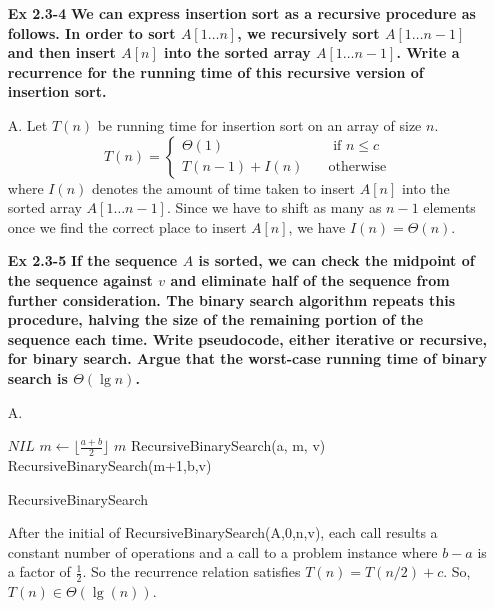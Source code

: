\documentclass[fontsize=12pt,paper=a4,open=any]{book}
\begin{document}
\begin{enumerate}
	\item[\textbf{Ex 2.3-4}]
		\textbf{We can express insertion sort as a recursive procedure as follows. In order to sort $A[1 \dots n]$, we recursively sort $A[1 \dots n-1]$ and then insert $A[n]$ into the sorted array $A[1 \dots n-1]$. Write a recurrence for the running time of this recursive version of insertion sort.}
			
	\item[A.]
		Let $T(n)$ be running time for insertion sort on an array of size $n$.\\
		\[ T(n) = \begin{cases} \Theta(1) & \quad \text{ if $n \leq c$}\\
		T(n-1) + I(n) & \quad \text{otherwise}
		\end{cases} \]
		where $I(n)$ denotes the amount of time taken to insert $A[n]$ into the sorted array $A[1 \dots n-1]$. Since we have to shift as many as $n-1$ elements once we find the correct place to insert $A[n]$, we have $I(n) = \Theta(n)$.
			
	\item[\textbf{Ex 2.3-5}]
		\textbf{If the sequence $A$ is sorted, we can check the midpoint of the sequence against $v$ and eliminate half of the sequence from further consideration. The binary search algorithm repeats this procedure, halving the size of the remaining portion of the sequence each time. Write pseudocode, either iterative or recursive, for binary search. Argue that the worst-case running time of binary search is $\Theta(\lg n)$.}
				
	\item[A.]
		\begin{algorithm}[H]
			
			\DontPrintSemicolon
			{
				\Return $NIL$\;
			}
			$m \longleftarrow \lfloor \frac{a+b}{2} \rfloor$\;
			{
				\Return $m$\;
			}
			{
				\Return RecursiveBinarySearch(a, m, v)\;
			}
			\Return RecursiveBinarySearch(m+1,b,v)\;
			\caption{RecursiveBinarySearch}
		\end{algorithm}
		
		After the initial of RecursiveBinarySearch(A,0,n,v), each call results a constant number of operations and a call to a problem instance where $b-a$ is a factor of $\frac{1}{2}$. So the recurrence relation satisfies $T(n) = T(n/2) + c$. So, $T(n) \in \Theta(\lg(n))$.
		

\end{enumerate}
\end{document}
